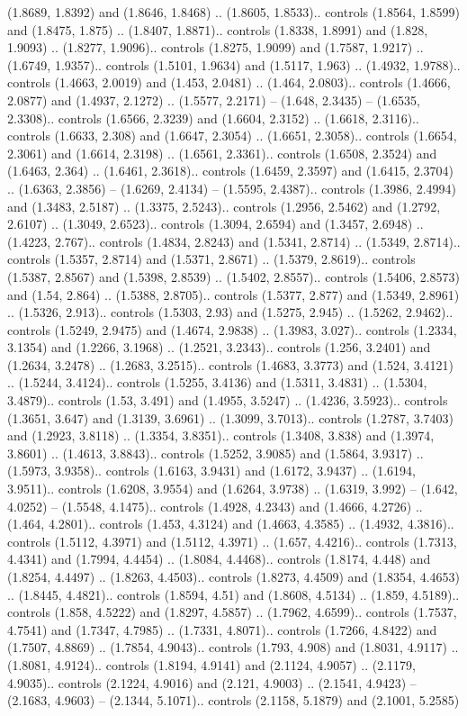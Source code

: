(1.8689, 1.8392) and (1.8646, 1.8468) .. (1.8605, 1.8533).. controls (1.8564, 1.8599) and (1.8475, 1.875) .. (1.8407, 1.8871).. controls (1.8338, 1.8991) and (1.828, 1.9093) .. (1.8277, 1.9096).. controls (1.8275, 1.9099) and (1.7587, 1.9217) .. (1.6749, 1.9357).. controls (1.5101, 1.9634) and (1.5117, 1.963) .. (1.4932, 1.9788).. controls (1.4663, 2.0019) and (1.453, 2.0481) .. (1.464, 2.0803).. controls (1.4666, 2.0877) and (1.4937, 2.1272) .. (1.5577, 2.2171) -- (1.648, 2.3435) -- (1.6535, 2.3308).. controls (1.6566, 2.3239) and (1.6604, 2.3152) .. (1.6618, 2.3116).. controls (1.6633, 2.308) and (1.6647, 2.3054) .. (1.6651, 2.3058).. controls (1.6654, 2.3061) and (1.6614, 2.3198) .. (1.6561, 2.3361).. controls (1.6508, 2.3524) and (1.6463, 2.364) .. (1.6461, 2.3618).. controls (1.6459, 2.3597) and (1.6415, 2.3704) .. (1.6363, 2.3856) -- (1.6269, 2.4134) -- (1.5595, 2.4387).. controls (1.3986, 2.4994) and (1.3483, 2.5187) .. (1.3375, 2.5243).. controls (1.2956, 2.5462) and (1.2792, 2.6107) .. (1.3049, 2.6523).. controls (1.3094, 2.6594) and (1.3457, 2.6948) .. (1.4223, 2.767).. controls (1.4834, 2.8243) and (1.5341, 2.8714) .. (1.5349, 2.8714).. controls (1.5357, 2.8714) and (1.5371, 2.8671) .. (1.5379, 2.8619).. controls (1.5387, 2.8567) and (1.5398, 2.8539) .. (1.5402, 2.8557).. controls (1.5406, 2.8573) and (1.54, 2.864) .. (1.5388, 2.8705).. controls (1.5377, 2.877) and (1.5349, 2.8961) .. (1.5326, 2.913).. controls (1.5303, 2.93) and (1.5275, 2.945) .. (1.5262, 2.9462).. controls (1.5249, 2.9475) and (1.4674, 2.9838) .. (1.3983, 3.027).. controls (1.2334, 3.1354) and (1.2266, 3.1968) .. (1.2521, 3.2343).. controls (1.256, 3.2401) and (1.2634, 3.2478) .. (1.2683, 3.2515).. controls (1.4683, 3.3773) and (1.524, 3.4121) .. (1.5244, 3.4124).. controls (1.5255, 3.4136) and (1.5311, 3.4831) .. (1.5304, 3.4879).. controls (1.53, 3.491) and (1.4955, 3.5247) .. (1.4236, 3.5923).. controls (1.3651, 3.647) and (1.3139, 3.6961) .. (1.3099, 3.7013).. controls (1.2787, 3.7403) and (1.2923, 3.8118) .. (1.3354, 3.8351).. controls (1.3408, 3.838) and (1.3974, 3.8601) .. (1.4613, 3.8843).. controls (1.5252, 3.9085) and (1.5864, 3.9317) .. (1.5973, 3.9358).. controls (1.6163, 3.9431) and (1.6172, 3.9437) .. (1.6194, 3.9511).. controls (1.6208, 3.9554) and (1.6264, 3.9738) .. (1.6319, 3.992) -- (1.642, 4.0252) -- (1.5548, 4.1475).. controls (1.4928, 4.2343) and (1.4666, 4.2726) .. (1.464, 4.2801).. controls (1.453, 4.3124) and (1.4663, 4.3585) .. (1.4932, 4.3816).. controls (1.5112, 4.3971) and (1.5112, 4.3971) .. (1.657, 4.4216).. controls (1.7313, 4.4341) and (1.7994, 4.4454) .. (1.8084, 4.4468).. controls (1.8174, 4.448) and (1.8254, 4.4497) .. (1.8263, 4.4503).. controls (1.8273, 4.4509) and (1.8354, 4.4653) .. (1.8445, 4.4821).. controls (1.8594, 4.51) and (1.8608, 4.5134) .. (1.859, 4.5189).. controls (1.858, 4.5222) and (1.8297, 4.5857) .. (1.7962, 4.6599).. controls (1.7537, 4.7541) and (1.7347, 4.7985) .. (1.7331, 4.8071).. controls (1.7266, 4.8422) and (1.7507, 4.8869) .. (1.7854, 4.9043).. controls (1.793, 4.908) and (1.8031, 4.9117) .. (1.8081, 4.9124).. controls (1.8194, 4.9141) and (2.1124, 4.9057) .. (2.1179, 4.9035).. controls (2.1224, 4.9016) and (2.121, 4.9003) .. (2.1541, 4.9423) -- (2.1683, 4.9603) -- (2.1344, 5.1071).. controls (2.1158, 5.1879) and (2.1001, 5.2585) 
